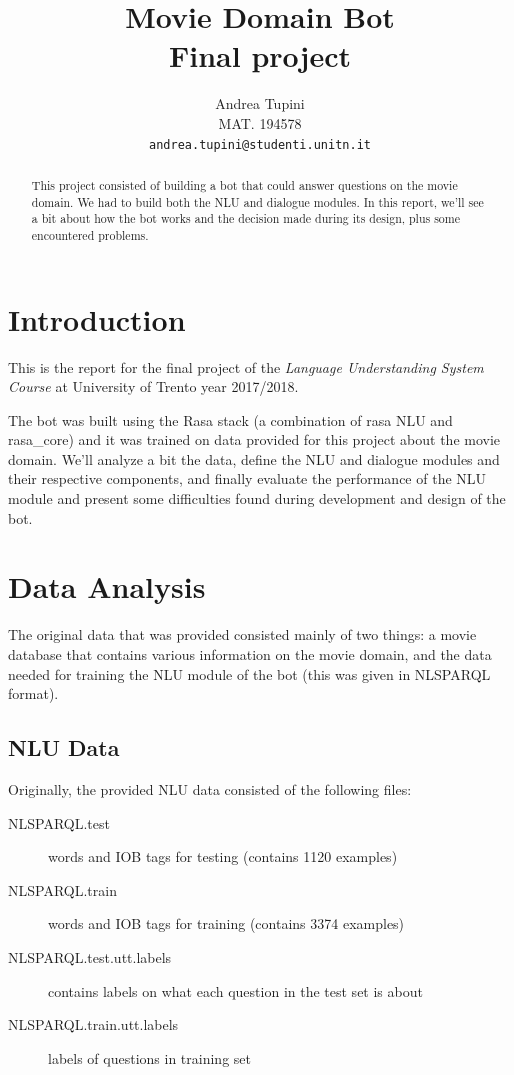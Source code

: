 \documentclass[11pt,a4paper]{article}
\title{Movie Domain Bot \\ Final project}
\author{Andrea Tupini \\
  MAT.  194578 \\
  {\tt andrea.tupini@studenti.unitn.it}}
\date{}
\newcommand{\mntestsamples}{1120 }
\newcommand{\mntrainsamples}{3374 }
\begin{document}
	
\maketitle

\begin{abstract}
	
	This project consisted of building a bot that could answer questions on the movie domain. We had to build both the NLU and dialogue modules. In this report, we'll see a bit about how the bot works and the decision made during its design, plus some encountered problems.
	
\end{abstract} 

\section{Introduction}
	
	This is the report for the final project of the \textit{Language Understanding System Course} \cite{lus-website} at University of Trento year  2017/2018. 
	
	The bot was built using the Rasa stack (a combination of rasa NLU  and rasa\_core) and it was trained on data provided for this project about the movie domain. We'll analyze a bit the data, define the NLU and dialogue modules and their respective components, and finally evaluate the performance of the NLU module and present some difficulties found during development and design of the bot.

	
\section{Data Analysis}
\label{sec-data-analysis}
	
	The original data that was provided consisted mainly of two things: a movie database that contains various information on the movie domain, and the data needed for training the NLU module of the bot (this was given in NLSPARQL format).
	
	\subsection{NLU Data}
	\label{ssec-nlu-data}
	
		Originally, the provided NLU data consisted of the following files: 
		
		\begin{description}
			\item[NLSPARQL.test] words and IOB tags for testing (contains \mntestsamples examples)
			\item[NLSPARQL.train] words and IOB tags for training (contains \mntrainsamples examples)
			\item[NLSPARQL.test.utt.labels] contains labels on what each question in the test set is about              
			\item[NLSPARQL.train.utt.labels] labels of questions in training set
		\end{description}
	
\end{document}
